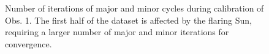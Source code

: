\documentclass{aa}
\begin{document}
\begin{figure}[tbh]

\caption{\label{fig:Major-and-minor}Number of iterations of major and minor
cycles during calibration of Obs. 1. The first
half of the dataset is affected by the flaring Sun, requiring
a larger number of major and minor iterations for convergence.}
\end{figure}


\end{document}
